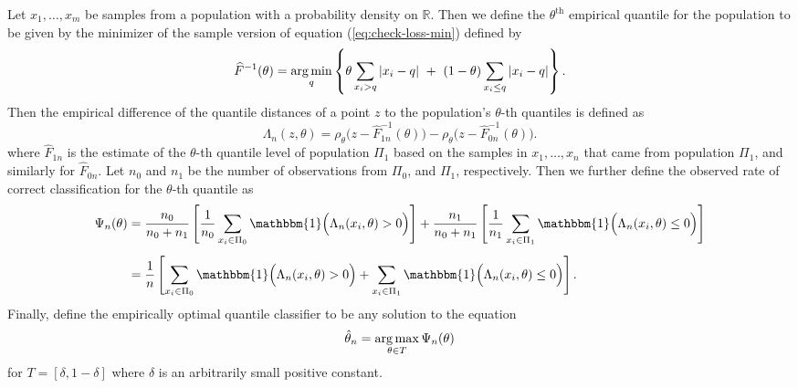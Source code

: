 Let $x_1, \dots, x_m$ be samples from a population with a probability density on
$\mathbb{R}$.  Then we define the $\theta^{\text{th}}$ empirical quantile for
the population to be given by the minimizer of the sample version of equation
(\ref{eq:check-loss-min}) defined by
\begin{equation}
  \label{eq:empirical-quantile}
  \widehat{F}^{-1} (\theta) = \operatorname*{arg\,min}_q \left\{
    \theta \sum_{ x_{i} > q } |x_{i} - q| ~+~
    (1 - \theta) \sum_{ x_{i} \leq q } |x_{i} - q|
  \right\}.
\end{equation}
Then the empirical difference of the quantile distances of a point $z$ to the
population's $\theta$-th quantiles is defined as
\[
  \Lambda_n (z, \theta) = \rho_{\theta}\Big(z - \widehat{F}_{1n}^{-1}(\theta)\Big) -
  \rho_{\theta}\Big(z - \widehat{F}_{0n}^{-1}(\theta)\Big).
\]
where $\widehat{F}_{1n}$ is the estimate of the $\theta$-th quantile level of
population $\Pi_1$ based on the samples in $x_1, \dots, x_n$ that came from
population $\Pi_1$, and similarly for $\widehat{F}_{0n}$.  Let $n_0$ and $n_1$
be the number of observations from $\Pi_0$, and $\Pi_1$, respectively.  Then we
further define the observed rate of correct classification for the $\theta$-th
quantile as
\begin{align}
  \begin{split}
    \Psi_n(\theta)
    &= \frac{n_0}{n_0 + n_1} \left[
      \frac{1}{n_0} \sum_{x_i \in \Pi_0}
      \mathbbm{1}\Big( \Lambda_n(x_i, \theta) > 0 \Big)
    \right] +
      \frac{n_1}{n_0 + n_1} \left[
        \frac{1}{n_1} \sum_{x_i \in \Pi_1}
        \mathbbm{1}\Big( \Lambda_n(x_i, \theta) \leq 0 \Big)
      \right] \\[1ex]
    &= \frac{1}{n} \left[
      \sum_{x_i \in \Pi_0} \mathbbm{1}\Big( \Lambda_n(x_i, \theta) > 0 \Big) +
      \sum_{x_i \in \Pi_1} \mathbbm{1}\Big( \Lambda_n(x_i, \theta) \leq 0 \Big)
    \right].
  \end{split}
\end{align}
Finally, define the empirically optimal quantile classifier to be any solution
to the equation
\begin{equation}
  \hat{\theta}_n = \operatorname*{arg\,max}_{\theta \in T} \Psi_n(\theta)
\end{equation}
for $T = [ \delta, 1 - \delta]$ where $\delta$ is an arbitrarily small positive
constant.



